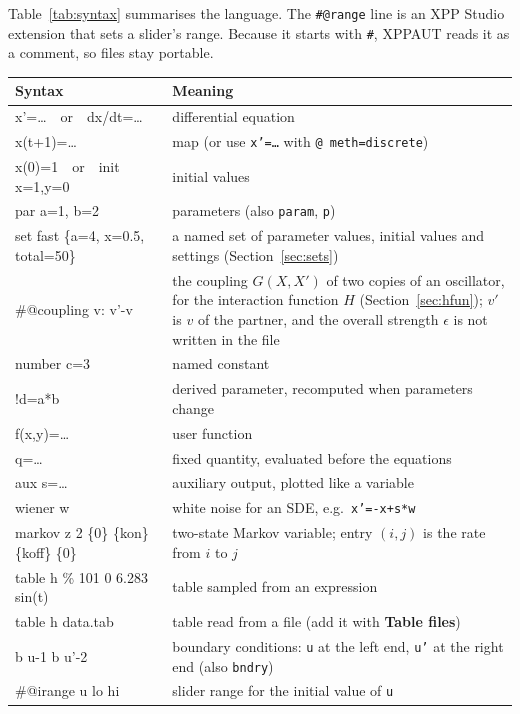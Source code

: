 \documentclass[11pt,a4paper]{article}
\newcommand{\XS}{\textsf{XPP Studio}}
\newcommand{\XPP}{\textsf{XPPAUT}}
\newcommand{\ui}[1]{\textsf{\textbf{#1}}}          %
\begin{document}
\noindent Table~\ref{tab:syntax} summarises the language. The \texttt{\#@range} line is an \XS{} extension that sets a slider's range. Because it starts with \texttt{\#}, \XPP{} reads it as a comment, so files stay portable.

\begin{table}[p]
\centering\small
\renewcommand{\arraystretch}{1.15}
\begin{tabularx}{\textwidth}{@{}>{\ttfamily}p{}X@{}}
\toprule
\normalfont Syntax & Meaning\\
\midrule
x'=\ldots\ \ or\ \ dx/dt=\ldots & differential equation\\
x(t+1)=\ldots & map (or use \texttt{x'=\ldots} with \texttt{@ meth=discrete})\\
x(0)=1\ \ or\ \ init x=1,y=0 & initial values\\
par a=1, b=2 & parameters (also \texttt{param}, \texttt{p})\\
set fast \{a=4, x=0.5, total=50\} & a named set of parameter values, initial values and settings (Section~\ref{sec:sets})\\
\#@coupling v: v'-v & the coupling $G(X,X')$ of two copies of an oscillator, for the interaction function $H$ (Section~\ref{sec:hfun}); $v'$ is $v$ of the partner, and the overall strength $\epsilon$ is not written in the file\\
number c=3 & named constant\\
!d=a*b & derived parameter, recomputed when parameters change\\
f(x,y)=\ldots & user function\\
q=\ldots & fixed quantity, evaluated before the equations\\
aux s=\ldots & auxiliary output, plotted like a variable\\
wiener w & white noise for an SDE, e.g.\ \texttt{x'=-x+s*w}\\
markov z 2 \quad\{0\} \{kon\} \quad \{koff\} \{0\} & two-state Markov variable; entry $(i,j)$ is the rate from $i$ to $j$\\
table h \% 101 0 6.283 sin(t) & table sampled from an expression\\
table h data.tab & table read from a file (add it with \ui{Table files})\\
b u-1 \quad b u'-2 & boundary conditions: \texttt{u} at the left end, \texttt{u'} at the right end (also \texttt{bndry})\\
\#@irange u lo hi & slider range for the initial value of \texttt{u}\\

\end{tabularx}
\end{table}
\end{document}
